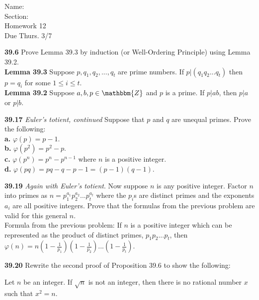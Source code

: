 \documentclass{article}
\begin{document}
\begin{flushright}
    Name: \underline{\hspace{3cm}}\\
    Section: \underline{\hspace{0.5cm}}\\
    Homework 12\\
    Due Thurs. 3/7
\end{flushright}


\begin{framed}
    \textbf{39.6} Prove Lemma 39.3 by induction (or Well-Ordering Principle)
    using Lemma 39.2.\\

    \textbf{Lemma 39.3} Suppose $p,q_1,q_2,...,q_t$ are prime numbers. If
    $p|(q_1q_2...q_t)$ then $p = q_i$ for some $1 \leq i \leq t$.\\

    \textbf{Lemma 39.2} Suppose $a, b, p \in \mathbbm{Z}$ and $p$ is a prime. If
    $p|ab$, then $p|a$ or $p|b$.
\end{framed}

\pagebreak

\begin{framed}
    \textbf{39.17} \textit{Euler's totient, continued} Suppose that $p$ and $q$
    are unequal primes. Prove the following:\\
    \textbf{a.} $\varphi(p) = p-1$.\\
    \textbf{b.} $\varphi(p^2) = p^2-p$.\\
    \textbf{c.} $\varphi(p^n) = p^n - p^{n-1}$ where $n$ is a positive integer.\\
    \textbf{d.} $\varphi(pq) = pq - q - p - 1 = (p-1)(q-1)$.
\end{framed}

\pagebreak

\begin{framed}
    \textbf{39.19} \textit{Again with Euler's totient}. Now suppose $n$ is any
    positive integer. Factor $n$ into primes as
    $n = p_1^{a_1}p_2^{a_2}...p_t^{a_t}$ where the $p_i$s are distinct primes
    and the exponents $a_i$ are all positive integers. Prove that the formulas
    from the previous problem are valid for this general $n$.\\

    Formula from the previous problem: If $n$ is a positive integer which can be
    represented as the product of distinct primes, $p_1p_2...p_t$, then
    $\varphi(n) = n(1-\frac{1}{p_1})(1-\frac{1}{p_2})...(1-\frac{1}{p_t})$.
\end{framed}

\pagebreak

\begin{framed}
    \textbf{39.20} Rewrite the second proof of Proposition 39.6 to show the
    following:

    Let $n$ be an integer. If $\sqrt{n}$ is not an integer, then there is no
    rational number $x$ such that $x^2 = n$.
\end{framed}
\end{document}

